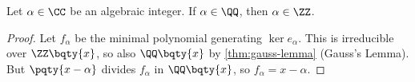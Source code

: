 \begin{proposition}
    \label{prop:rational-algebraic-integer}%
    Let \(\alpha \in \CC\) be an algebraic integer. If \(\alpha \in \QQ\), then \(\alpha \in \ZZ\).
\end{proposition}

\begin{proof}
    Let \(f_\alpha\) be the minimal polynomial generating \(\ker e_\alpha\). This is irreducible over \(\ZZ\bqty{x}\), so also \(\QQ\bqty{x}\) by \autoref{thm:gauss-lemma} (Gauss's Lemma). But \(\pqty{x - \alpha}\) divides \(f_\alpha\) in \(\QQ\bqty{x}\), so \(f_\alpha = x - \alpha\).
\end{proof}